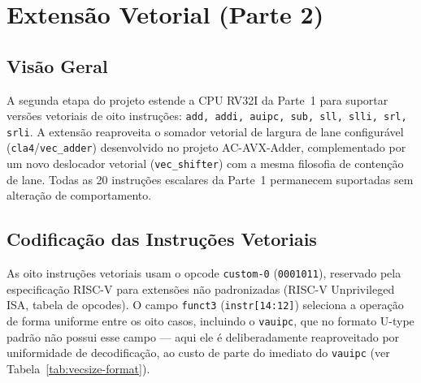 \documentclass[12pt, a4paper]{article}
\newcommand{\code}[1]{\texttt{#1}}
\begin{document}

\section{Extensão Vetorial (Parte 2)}

\subsection{Visão Geral}

A segunda etapa do projeto estende a CPU RV32I da Parte~1 para suportar
versões vetoriais de oito instruções: \code{add, addi, auipc, sub, sll,
slli, srl, srli}. A extensão reaproveita o somador vetorial de largura de
lane configurável (\code{cla4}/\code{vec\_adder}) desenvolvido no projeto
AC-AVX-Adder, complementado por um novo deslocador vetorial
(\code{vec\_shifter}) com a mesma filosofia de contenção de lane. Todas
as 20 instruções escalares da Parte~1 permanecem suportadas sem
alteração de comportamento.

\subsection{Codificação das Instruções Vetoriais}

As oito instruções vetoriais usam o opcode \code{custom-0}
(\code{0001011}), reservado pela especificação RISC-V para extensões não
padronizadas (RISC-V Unprivileged ISA, tabela de opcodes). O campo
\code{funct3} (\code{instr[14:12]}) seleciona a operação de forma
uniforme entre os oito casos, incluindo o \code{vauipc}, que no formato
U-type padrão não possui esse campo --- aqui ele é deliberadamente
reaproveitado por uniformidade de decodificação, ao custo de parte do
imediato do \code{vauipc} (ver Tabela~\ref{tab:vecsize-format}).
\end{document}

